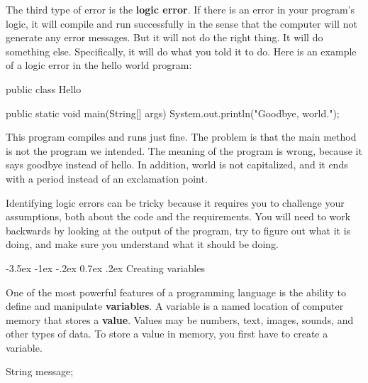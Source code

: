 \documentclass[12pt]{book}
\makeatletter
\theoremstyle{exercise}
\renewcommand{\section}{\@startsection{section}{1}{\z@}%
    {-3.5ex \@plus -1ex \@minus -.2ex}%
    {0.7ex \@plus.2ex}%
    {\normalfont\Large\bfseries}}
\renewcommand\subsection{\@startsection{subsection}{2}{\z@}%
    {-3.25ex\@plus -1ex \@minus -.2ex}%
    {0.3ex \@plus .2ex}%
    {\normalfont\large\bfseries}}
\makeatother
\begin{document}


The third type of error is the {\bf logic error}.
If there is an error in your program's logic, it will compile and run successfully in the sense that the computer will not generate any error messages.
But it will not do the right thing.
It will do something else.
Specifically, it will do what you told it to do.
Here is an example of a logic error in the hello world program:

\begin{code}
public class Hello {

    public static void main(String[] args) {
        System.out.println("Goodbye, world.");
    }

}
\end{code}

This program compiles and runs just fine.
The problem is that the main method is not the program we intended.
The meaning of the program is wrong, because it says goodbye instead of hello.
In addition, world is not capitalized, and it ends with a period instead of an exclamation point.

Identifying logic errors can be tricky because it requires you to challenge your assumptions, both about the code and the requirements.
You will need to work backwards by looking at the output of the program, try to figure out what it is doing, and make sure you understand what it should be doing.


\section{Creating variables}


One of the most powerful features of a programming language is the ability to define and manipulate {\bf variables}.
A variable is a named location of computer memory that stores a {\bf value}.
Values may be numbers, text, images, sounds, and other types of data.
To store a value in memory, you first have to create a variable.

\begin{code}
    String message;
\end{code}
\end{document}
